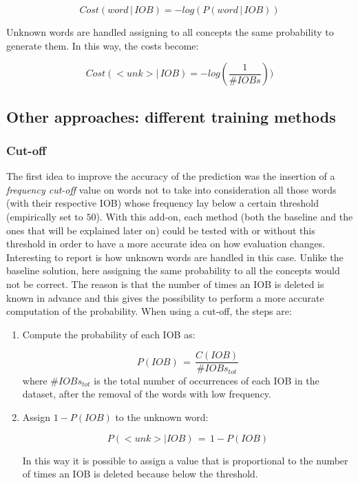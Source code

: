 \documentclass[11pt,a4paper]{article}
\begin{document}
	\[Cost(word\,|\,IOB)=-log(P(word\,|\,IOB)) \]
	
	Unknown words are handled assigning to all concepts the same probability to generate them. In this way, the costs become:

	\[Cost(<unk>|\,IOB)=-log(\frac{1}{\#IOBs})) \]	

\subsection{Other approaches: different training methods}
\label{ssec:otherapp}



\subsubsection{Cut-off}

The first idea to improve the accuracy of the prediction was the insertion of a \textit{frequency cut-off} value on words not to take into consideration all those words (with their respective IOB) whose frequency lay below a certain threshold (empirically set to $50$). With this add-on, each method (both the baseline and the ones that will be explained later on) could be tested with or without this threshold in order to have a more accurate idea on how evaluation changes.\\

Interesting to report is how unknown words are handled in this case. Unlike the baseline solution, here assigning the same probability to all the concepts would not be correct. The reason is that the number of times an IOB is deleted is known in advance and this gives the possibility to perform a more accurate computation of the probability. When using a cut-off, the steps are:
\begin{enumerate}
	\item Compute the probability of each IOB as:
	
		\[P(IOB)\,=\,\frac{C(IOB)}{\#IOBs_{tot}}\]
	where $\#IOBs_{tot}$ is the total number of occurrences of each IOB in the dataset, after the removal of the words with low frequency.
	\item Assign $1-P(IOB)$ to the unknown word:
	
		\[P(<unk>|IOB)\,=\,1-P(IOB)\]
		
		In this way it is possible to assign a value that is proportional to the number of times an IOB is deleted because below the threshold.
\end{enumerate}
\end{document}
